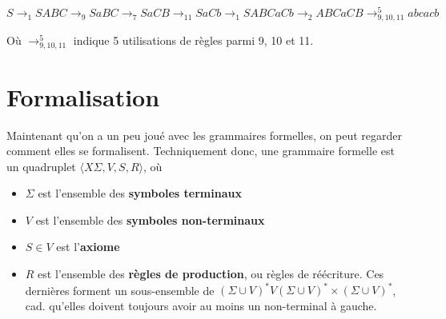  \[
 S \rightarrow_1 SABC \rightarrow_9 SaBC \rightarrow_7 SaCB \rightarrow_{11} SaCb \rightarrow_1 SABCaCb \rightarrow_2 ABCaCB \rightarrow_{9,10,11}^5 abcacb 
 \]

 Où $\rightarrow_{9,10,11}^5$ indique 5 utilisations de règles parmi 9, 10 et 11.
 
 \section{Formalisation}
 
 Maintenant qu'on a un peu joué avec les grammaires formelles, on peut regarder comment elles se formalisent. Techniquement donc, une grammaire formelle est un quadruplet $\big \langle X\Sigma, V, S, R \big \rangle$, où
 
 \begin{itemize}
 \item $\Sigma$ est l'ensemble des \textbf{symboles terminaux}
 \item $V$ est l'ensemble des \textbf{symboles non-terminaux}
 \item $S \in V$ est l'\textbf{axiome}
 \item $R$ est l'ensemble des \textbf{règles de production}, ou règles de réécriture. Ces dernières forment un sous-ensemble de $(\Sigma \cup V)^*V(\Sigma \cup V)^* \times (\Sigma \cup V)^*$, cad. qu'elles doivent toujours avoir au moins un non-terminal à gauche. 
 \end{itemize}
 
 
 
